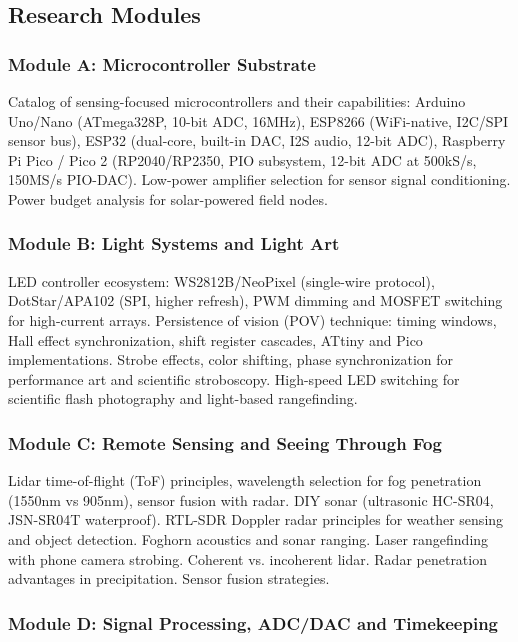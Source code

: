 \documentclass[11pt,letterpaper]{article}
\begin{document}
\subsection{Research Modules}

\subsubsection{Module A: Microcontroller Substrate}

Catalog of sensing-focused microcontrollers and their capabilities: Arduino Uno/Nano (ATmega328P, 10-bit ADC, 16MHz), ESP8266 (WiFi-native, I2C/SPI sensor bus), ESP32 (dual-core, built-in DAC, I2S audio, 12-bit ADC), Raspberry Pi Pico / Pico 2 (RP2040/RP2350, PIO subsystem, 12-bit ADC at 500kS/s, 150MS/s PIO-DAC). Low-power amplifier selection for sensor signal conditioning. Power budget analysis for solar-powered field nodes.

\subsubsection{Module B: Light Systems and Light Art}

LED controller ecosystem: WS2812B/NeoPixel (single-wire protocol), DotStar/APA102 (SPI, higher refresh), PWM dimming and MOSFET switching for high-current arrays. Persistence of vision (POV) technique: timing windows, Hall effect synchronization, shift register cascades, ATtiny and Pico implementations. Strobe effects, color shifting, phase synchronization for performance art and scientific stroboscopy. High-speed LED switching for scientific flash photography and light-based rangefinding.

\subsubsection{Module C: Remote Sensing and Seeing Through Fog}

Lidar time-of-flight (ToF) principles, wavelength selection for fog penetration (1550nm vs 905nm), sensor fusion with radar. DIY sonar (ultrasonic HC-SR04, JSN-SR04T waterproof). RTL-SDR Doppler radar principles for weather sensing and object detection. Foghorn acoustics and sonar ranging. Laser rangefinding with phone camera strobing. Coherent vs. incoherent lidar. Radar penetration advantages in precipitation. Sensor fusion strategies.

\subsubsection{Module D: Signal Processing, ADC/DAC and Timekeeping}
\end{document}
